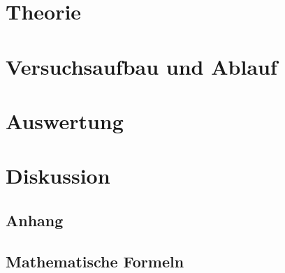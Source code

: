 \documentclass[a4,10.5pt]{article}
\newcommand{\V}{V402}
\begin{document}



\tableofcontents
\clearpage


\section{Theorie}

\clearpage


\section{Versuchsaufbau und Ablauf}

\clearpage


\section{Auswertung}
%
%

\clearpage


\section{Diskussion}


\clearpage
\begin{appendix}
\section{Anhang}
\subsection{Mathematische Formeln}

\end{appendix}
\clearpage
\nocite{\V}
\printbibliography[title = Literaturverzeichnis]
\listoffigures
\listoftables
\listoftodos
\end{document}
